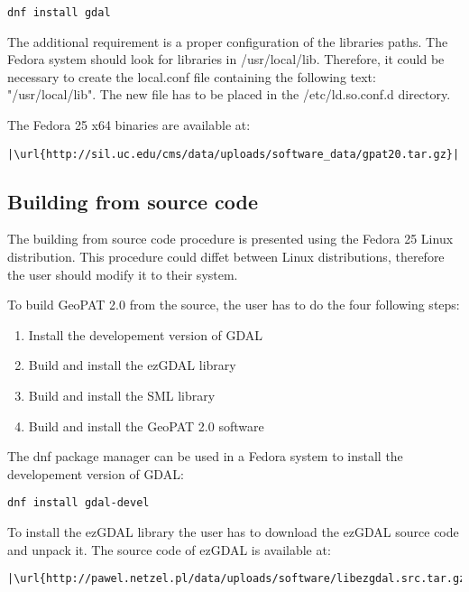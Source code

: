 \begin{lstlisting}
dnf install gdal
\end{lstlisting}

The additional requirement is a proper configuration of the libraries paths.
The Fedora system should look for libraries in /usr/local/lib.
Therefore, it could be necessary to create the local.conf file containing the following text: "/usr/local/lib".
The new file has to be placed in the /etc/ld.so.conf.d directory.

The Fedora 25 x64 binaries are available at:

\begin{lstlisting}[escapechar=|]
|\url{http://sil.uc.edu/cms/data/uploads/software_data/gpat20.tar.gz}|
\end{lstlisting}

\subsection{Building from source code}

The building from source code procedure is presented using the Fedora 25 Linux distribution.
This procedure could diffet between Linux distributions, therefore the user should modify it to their system.

To build GeoPAT 2.0 from the source, the user has to do the four following steps:

\begin{enumerate}
    \item{Install the developement version of GDAL}
    \item{Build and install the ezGDAL library}
    \item{Build and install the SML library}
    \item{Build and install the GeoPAT 2.0 software}
\end{enumerate}

The dnf package manager can be used in a Fedora system to install the developement version of GDAL:

\begin{lstlisting}
dnf install gdal-devel
\end{lstlisting}

To install the ezGDAL library the user has to download the ezGDAL source code and unpack it.
The source code of ezGDAL is available at:

\begin{lstlisting}[escapechar=|]
|\url{http://pawel.netzel.pl/data/uploads/software/libezgdal.src.tar.gz}|
\end{lstlisting}

